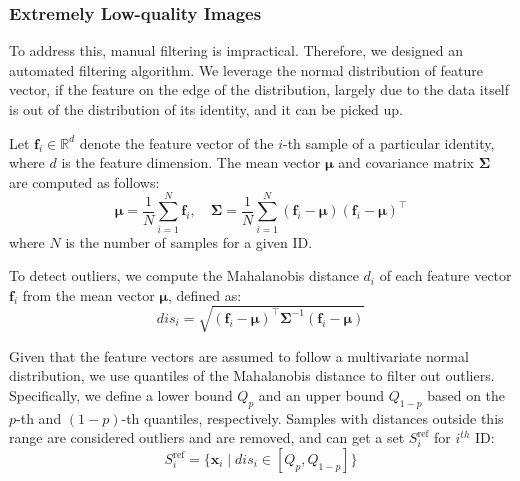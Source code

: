 \subsubsection{Extremely Low-quality Images}

To address this, manual filtering is impractical. Therefore, we designed an automated filtering algorithm. We leverage the normal distribution of feature vector, if the feature on the edge of the distribution, largely due to the data itself is out of the distribution of its identity, and it can be picked up. 

Let \( \mathbf{f}_i \in \mathbb{R}^d \) denote the feature vector of the \( i \)-th sample of a particular identity, where \( d \) is the feature dimension. The mean vector \( \boldsymbol{\mu} \) and covariance matrix \( \boldsymbol{\Sigma} \) are computed as follows:
\begin{equation} 
\boldsymbol{\mu} = \frac{1}{N} \sum_{i=1}^{N} \mathbf{f}_i, \quad \boldsymbol{\Sigma} = \frac{1}{N} \sum_{i=1}^{N} (\mathbf{f}_i - \boldsymbol{\mu})(\mathbf{f}_i - \boldsymbol{\mu})^\top
\end{equation}
where \( N \) is the number of samples for a given ID.

To detect outliers, we compute the Mahalanobis distance \( d_i \) of each feature vector \( \mathbf{f}_i \) from the mean vector \( \boldsymbol{\mu} \), defined as:
\begin{equation}
dis_i = \sqrt{ (\mathbf{f}_i - \boldsymbol{\mu})^\top \boldsymbol{\Sigma}^{-1} (\mathbf{f}_i - \boldsymbol{\mu}) }
\end{equation}

Given that the feature vectors are assumed to follow a multivariate normal distribution, we use quantiles of the Mahalanobis distance to filter out outliers. Specifically, we define a lower bound \( Q_p \) and an upper bound \( Q_{1-p} \) based on the \( p \)-th and \( (1 - p) \)-th quantiles, respectively. Samples with distances outside this range are considered outliers and are removed, and can get a set $S^{\text{ref}}_{i}$ for $i^{th}$ ID:
\begin{equation} \label{outliers}
S_i^{\text{ref}} = \{ \mathbf{x}_i \mid dis_i \in [Q_p, Q_{1-p}] \}
\end{equation}

